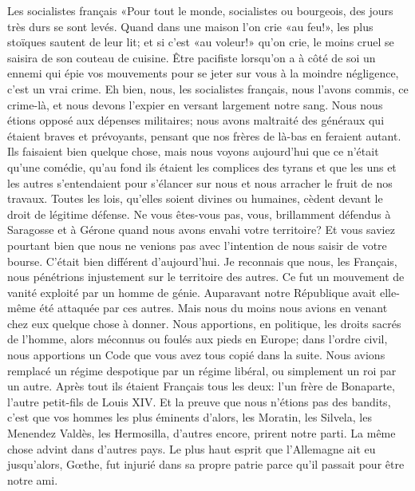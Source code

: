 \begin{chapter}{Les socialistes français}
«Pour tout le monde, socialistes ou bourgeois, des jours très durs se
sont levés. Quand dans une maison l'on crie «au feu!», les plus stoïques
sautent de leur lit; et si c'est «au voleur!» qu'on crie, le moins cruel
se saisira de son couteau de cuisine. Être pacifiste lorsqu'on a à côté
de soi un ennemi qui épie vos mouvements pour se jeter sur vous à la
moindre négligence, c'est un vrai crime. Eh bien, nous, les socialistes
français, nous l'avons commis, ce crime-là, et nous devons l'expier en
versant largement notre sang. Nous nous étions opposé aux dépenses
militaires; nous avons maltraité des généraux qui étaient braves et
prévoyants, pensant que nos frères de là-bas en feraient autant. Ils
faisaient bien quelque chose, mais nous voyons aujourd'hui que ce
n'était qu'une comédie, qu'au fond ils étaient les complices des tyrans
et que les uns et les autres s'entendaient pour s'élancer sur nous et
nous arracher le fruit de nos travaux. Toutes les lois, qu'elles soient
divines ou humaines, cèdent devant le droit de légitime défense. Ne vous
êtes-vous pas, vous, brillamment défendus à Saragosse et à Gérone quand
nous avons envahi votre territoire? Et vous saviez pourtant bien que
nous ne venions pas avec l'intention de nous saisir de votre bourse.
C'était bien différent d'aujourd'hui. Je reconnais que nous, les
Français, nous pénétrions injustement sur le territoire des autres. Ce
fut un mouvement de vanité exploité par un homme de génie. Auparavant
notre République avait elle-même été attaquée par ces autres. Mais nous
du moins nous avions en venant chez eux quelque chose à donner. Nous
apportions, en politique, les droits sacrés de l'homme, alors méconnus
ou foulés aux pieds en Europe; dans l'ordre civil, nous apportions un
Code que vous avez tous copié dans la suite. Nous avions remplacé un
régime despotique par un régime libéral, ou simplement un roi par un
autre. Après tout ils étaient Français tous les deux: l'un frère de
Bonaparte, l'autre petit-fils de Louis XIV. Et la preuve que nous
n'étions pas des bandits, c'est que vos hommes les plus éminents
d'alors, les Moratin, les Silvela, les Menendez Valdès, les Hermosilla,
d'autres encore, prirent notre parti. La même chose advint dans d'autres
pays. Le plus haut esprit que l'Allemagne ait eu jusqu'alors, Gœthe,
fut injurié dans sa propre patrie parce qu'il passait pour être notre
ami.


\end{chapter}
